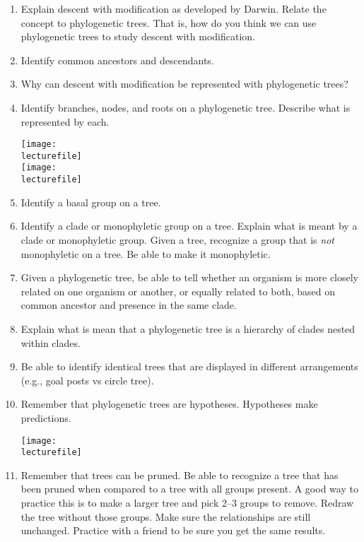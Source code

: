 \documentclass[letterpaper]{tufte-handout}
\newcommand\lecturefile{163_lecture10_fullsize}
\begin{document}
\begin{enumerate}

	\item Explain descent with modification as developed by Darwin. Relate the concept to phylogenetic trees. That is, how do you think we can use phylogenetic trees to study descent with modification. 

	\item Identify common ancestors and descendants.

	\item Why can descent with modification be represented with phylogenetic trees? 

	\item Identify branches, nodes, and roots on a phylogenetic tree. Describe what is represented by each.

	\begin{marginfigure}[0.75in]
		\texttt{[image: \\lecturefile]}\\
		\texttt{[image: \\lecturefile]}
	\end{marginfigure}

	\item Identify a basal group on a tree.

	\item Identify a clade or monophyletic group on a tree. Explain what is meant by a clade or monophyletic group. Given a tree, recognize a group that is \emph{not} monophyletic on a tree.  Be able to make it monophyletic.

	\item Given a phylogenetic tree, be able to tell whether an organism is more closely related on one organism or another, or equally related to both, based on common ancestor and presence in the same clade. 

	\item Explain what is mean that a phylogenetic tree is a hierarchy of clades nested within clades.

	\item Be able to identify identical trees that are displayed in different arrangements (e.g., goal posts vs circle tree).

	\item Remember that phylogenetic trees are hypotheses. Hypotheses make predictions.
\begin{marginfigure}[0.75in]
	\texttt{[image: \\lecturefile]}
\end{marginfigure}

	\item Remember that trees can be pruned. Be able to recognize a tree that has been pruned when compared to a tree with all groups present. A good way to practice this is to make a larger tree and pick 2--3 groups to remove. Redraw the tree without those groups. Make sure the relationships are still unchanged. Practice with a friend to be sure you get the same results.


\end{enumerate}
\end{document}
